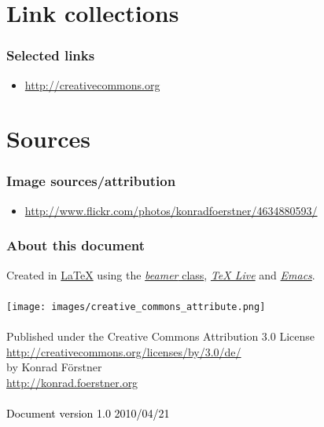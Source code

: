 \documentclass{beamer}
\begin{document}
\section*{Link collections}

\begin{frame}
  \frametitle{Selected links}
   {\tiny
     \begin{block}{}
       \begin{itemize}
       \item \url{http://creativecommons.org}
      \end{itemize}
  \end{block}
}
\end{frame}

\section*{Sources}

\begin{frame}
  \frametitle{Image sources/attribution}
   {\tiny
     \begin{block}{}
       \begin{itemize}
       \item \url{http://www.flickr.com/photos/konradfoerstner/4634880593/}
      \end{itemize}
  \end{block}
}
\end{frame}

\begin{frame}
  \frametitle{About this document} 
  \begin{center}
    {\tiny
      Created in \href{http://www.latex-project.org}{\LaTeX} using the
      \href{http://latex-beamer.sourceforge.net}{\textit{beamer}
        class}, \href{http://www.tug.org/texlive/}{\textit{TeX Live}} and
      \href{http://www.gnu.org/software/emacs}{\textit{Emacs}}.\\ \ \\

      \texttt{[image: images/creative\_commons\_attribute.png]}
      \ \\ \ \\
      Published under the Creative Commons Attribution 3.0 License\\
      \url{http://creativecommons.org/licenses/by/3.0/de/}\\
      by Konrad Förstner\\ 
      \url{http://konrad.foerstner.org}\\ \ \\
  }
  {\tiny \textcolor{black}{Document version 1.0 2010/04/21}}
  \end{center}
\end{frame}
\end{document}
